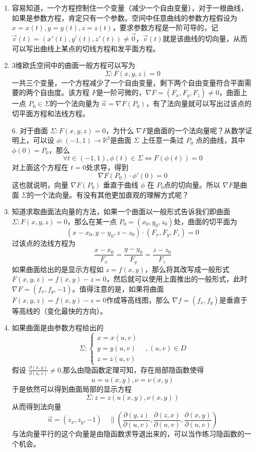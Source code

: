 \begin{enumerate}
    \item 容易知道，一个方程控制住一个变量（减少一个自由变量），对于一根曲线，如果是参数方程，肯定只有一个参数。空间中任意曲线的参数方程假设为
    $ x = x(t), y=y(t), z = z(t)$，要求参数方程是一阶可导的，记 $\vec{v}(t) = (x'(t), y'(t), z'(t)) \neq \vec{0}$，$\vec{v}(t)$就是该曲线的切向量，从而可以写出曲线上某点的切线方程和发平面方程。

    \item 3维欧氏空间中的曲面一般方程可以写为
    $$
    \Sigma: F(x,y,z) =0
    $$
    一共三个变量，一个方程减少了一个自由变量，剩下两个自由变量符合平面需要的两个自由度。该方程 $F$是一阶可微的，$\nabla F = (F_x, F_y, F_z) \neq 0$，曲面上一点 $P_0 \in \Sigma $的一个法向量为 $\vec{n} = \nabla F(P_0)$，有了法向量就可以写出过该点的切平面方程和法线方程。
    
    6. 对于曲面 $\Sigma : F(x,y,z)=0$，为什么 $\nabla F$是曲面的一个法向量呢？从数学证明上，可以设 $\phi:(-1,1) \to \mathbb{R}^3$是曲面 $\Sigma$ 上任意一条过 $P_0$ 点的曲线，其中 $\phi(0) = P_0$，那么
    $$
    \forall t \in (-1,1), \phi (t) \in \Sigma \Leftrightarrow F(\phi(t)) = 0
    $$
    对上面这个方程在 $t=0$处求导，得到
    $$
    \nabla F (P_0) \cdot \phi '(0) =0
    $$
    这也就说明，向量 $\nabla F(P_0)$ 垂直于曲线 $\phi$ 在 $P_0$点的切向量。所以 $\nabla F$是曲面 $\Sigma$的一个法向量。有没有其他更加直观的理解方式呢？

    \item 知道求取曲面法向量的方法，如果一个曲面以一般形式告诉我们即曲面 $\Sigma : F(x,y,z)=0$，那么在某一点 $P_0 = (x_0,y_0,z_0)$处，曲面的切平面为
    $$
    (x-x_0,y-y_0,z-z_0) \cdot (F_x, F_y, F_z) = 0
    $$
    过该点的法线方程为
    $$
    \frac{x-x_0}{F_x} = \frac{y-y_0}{F_y} = \frac{z-z_0}{F_z}
    $$
    如果曲面给出的是显示方程如 $z = f(x,y)$，那么将其改写成一般形式 $F(x,y,z) = f(x,y)-z = 0$，然后就可以使用上面推出的一般形式，此时 $\nabla F = (f_x,f_y,-1)$。值得注意的是，如果将曲面 $F(x,y,z) = f(x,y)-z=0$作成等高线图，那么 $\nabla f = (f_x, f_y)$是垂直于等高线的（变化最快的方向）。

    \item 如果曲面是由参数方程给出的
    $$
    \Sigma:\begin{cases}x=x(u,v)\\y=y(u,v)\\z=z(u,v)&\end{cases},(u,v)\in D
    $$
    假设 $\frac{\partial(x,y)}{\partial(u,v)}\neq 0$,那么由隐函数定理可知，存在局部隐函数使得
    $$
    u=u(x,y),\nu=\nu(x,y)
    $$
    于是依然可以得到曲面局部的显示方程
    $$
    \Sigma:z=z(u(x,y),\nu(x,y))
    $$
    从而得到法向量
    $$
    \vec{n}=(z_x,z_y,-1)\quad \parallel \left(\frac{\partial(y,z)}{\partial(u,v)},\frac{\partial(z,x)}{\partial(u,v)},\frac{\partial(x,y)}{\partial(u,v)}\right)
    $$
    与法向量平行的这个向量是由隐函数求导退出来的，可以当作练习隐函数的一个机会。


\end{enumerate}
